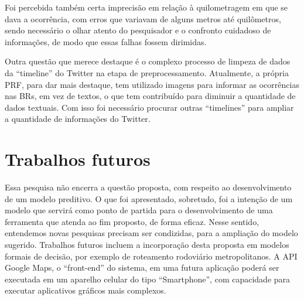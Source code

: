 Foi percebida também certa imprecisão em relação à quilometragem em que se dava a ocorrência, com erros que variavam de alguns metros até quilômetros, sendo necessário o olhar atento do pesquisador e o confronto cuidadoso de informações, de modo que essas falhas fossem dirimidas.

Outra questão que merece destaque é o complexo processo de limpeza de dados da ``timeline'' do Twitter na etapa de preprocessamento. Atualmente, a própria PRF, para dar mais destaque, tem utilizado imagens para informar as ocorrências nas BRs, em vez de textos, o que tem contribuído para diminuir a quantidade de dados textuais. Com isso foi necessário procurar outras ``timelines'' para ampliar a quantidade de informações do Twitter.

\pagebreak

\section{Trabalhos futuros}

Essa pesquisa não encerra a questão proposta, com respeito ao desenvolvimento de um modelo preditivo. O que foi apresentado, sobretudo, foi a intenção de um modelo que servirá como ponto de partida para o desenvolvimento de uma ferramenta que atenda ao fim proposto, de forma eficaz. Nesse sentido, entendemos novas pesquisas precisam ser condizidas, para a ampliação do modelo sugerido. 
Trabalhos futuros incluem a incorporação desta proposta
em modelos formais de decisão, por exemplo de roteamento
rodoviário metropolitanos. A API Google Maps, o ``front-end'' do sistema, em uma futura aplicação poderá ser executada em um aparelho 
celular do tipo ``Smartphone'', com capacidade para executar aplicativos gráficos mais complexos.